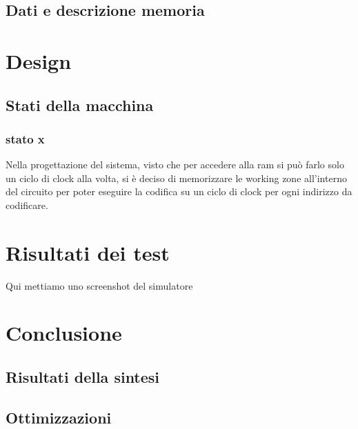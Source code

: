 \documentclass{article}
\begin{document}
\subsection{Dati e descrizione memoria}
\section{Design}
\subsection{Stati della macchina}
\subsubsection{stato x}
Nella progettazione del sistema, visto che per accedere alla ram si può farlo solo un ciclo di clock alla volta, si è deciso di memorizzare le working zone all'interno del circuito per poter eseguire la codifica su un ciclo di clock per ogni indirizzo da codificare.
\section{Risultati dei test}
Qui mettiamo uno screenshot del simulatore
\section{Conclusione}
\subsection{Risultati della sintesi}
\subsection{Ottimizzazioni}
\end{document}

